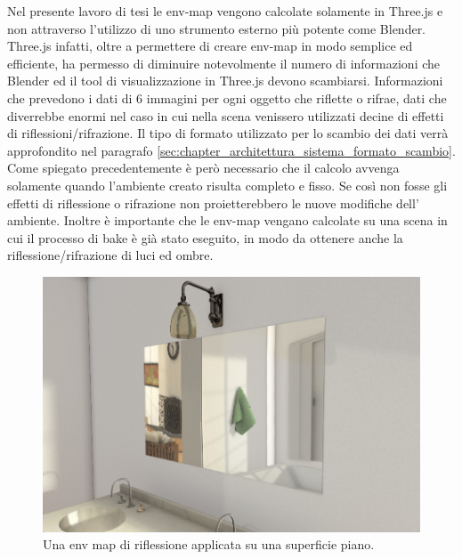 Nel presente lavoro di tesi le env-map vengono calcolate solamente in Three.js e non attraverso l’utilizzo di uno strumento esterno più potente come Blender.
Three.js infatti, oltre a permettere di creare env-map in modo semplice ed efficiente, ha permesso di diminuire notevolmente il numero di informazioni che Blender ed il tool di visualizzazione in Three.js devono scambiarsi. Informazioni che prevedono i dati di 6 immagini per ogni oggetto che riflette o rifrae, dati che diverrebbe enormi nel caso in cui nella scena venissero utilizzati decine di effetti di riflessioni/rifrazione. Il tipo di formato utilizzato per lo scambio dei dati verrà approfondito nel paragrafo \ref{sec:chapter_architettura_sistema_formato_scambio}.
\\
Come spiegato precedentemente è però necessario che il calcolo avvenga solamente quando l’ambiente creato risulta completo e fisso. Se così non fosse gli effetti di riflessione o rifrazione non proietterebbero le nuove modifiche dell’ ambiente.
Inoltre è importante che le env-map vengano calcolate su una scena in cui il processo di bake è già stato eseguito, in modo da ottenere anche la riflessione/rifrazione di luci ed ombre.
\\
\begin{figure}[htb]
 \centering
 \includegraphics[width=1\linewidth]{images/chapter_lrl/lrl_envspecchio.png}\hfill
 \caption[Env map di riflessione]{Una env map di riflessione applicata su una superficie piano.}
 \label{fig:lrl_envspecchio}
\end{figure}

